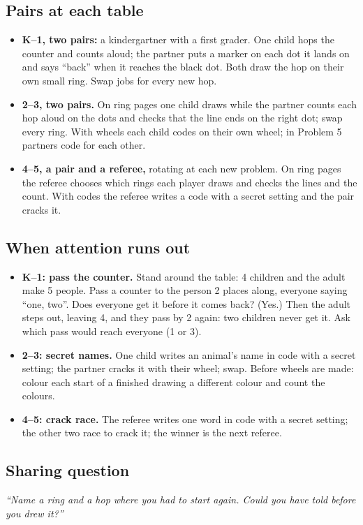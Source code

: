 \documentclass[11pt]{article}
\begin{document}
\subsection{Pairs at each table}
\begin{itemize}
\item \textbf{K--1, two pairs:} a kindergartner with a first grader. One child hops the counter and counts aloud;
  the partner puts a marker on each dot it lands on and says ``back'' when it reaches the black dot. Both draw the
  hop on their own small ring. Swap jobs for every new hop.
\item \textbf{2--3, two pairs.} On ring pages one child draws while the partner counts each hop aloud on the dots
  and checks that the line ends on the right dot; swap every ring. With wheels each child codes on their own wheel;
  in Problem 5 partners code for each other.
\item \textbf{4--5, a pair and a referee,} rotating at each new problem. On ring pages the referee chooses which
  rings each player draws and checks the lines and the count. With codes the referee writes a code with a secret
  setting and the pair cracks it.
\end{itemize}

\subsection{When attention runs out}
\begin{itemize}
\item \textbf{K--1: pass the counter.} Stand around the table: 4 children and the adult make 5 people. Pass a
  counter to the person 2 places along, everyone saying ``one, two''. Does everyone get it before it comes back?
  (Yes.) Then the adult steps out, leaving 4, and they pass by 2 again: two children never get it. Ask which pass
  would reach everyone (1 or 3).
\item \textbf{2--3: secret names.} One child writes an animal's name in code with a secret setting; the partner
  cracks it with their wheel; swap. Before wheels are made: colour each start of a finished drawing a different
  colour and count the colours.
\item \textbf{4--5: crack race.} The referee writes one word in code with a secret setting; the other two race to
  crack it; the winner is the next referee.
\end{itemize}

\subsection{Sharing question}
\emph{``Name a ring and a hop where you had to start again. Could you have told before you drew it?''}
\end{document}
